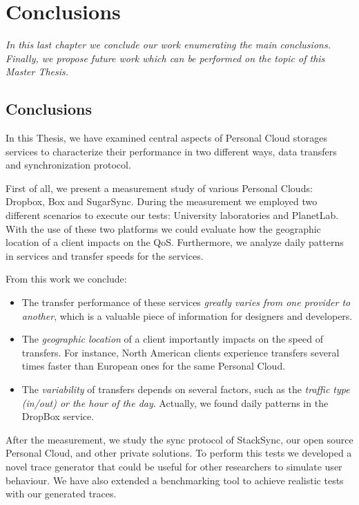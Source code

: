 \chapter{Conclusions}

\emph{In this last chapter we conclude our work enumerating the main conclusions. Finally, we propose future work which can be performed on the topic of this Master Thesis.}

\section{Conclusions}
In this Thesis, we have examined central aspects of Personal Cloud storages 
services to characterize their performance in two different ways, data transfers
and synchronization protocol.

First of all, we present a measurement study of various Personal Clouds: Dropbox, Box and SugarSync.
During the measurement we employed two different scenarios to execute our tests:
University laboratories and PlanetLab. With the use of these two platforms we could
evaluate how the geographic location of a client impacts on the QoS. Furthermore, we analyze
daily patterns in services and transfer speeds for the services.

From this work we conclude:
\begin{itemize}
	\item The transfer performance of these services 
	\textit{greatly varies from one provider to another}, which is a valuable 
	piece of information for designers and developers.
	
	\item The \textit{geographic location} of a client importantly impacts on
	the speed of transfers. For instance, North American clients experience 
	transfers several times faster than European ones for the same Personal Cloud. 
	
	\item The \textit{variability} of transfers depends on several
	factors, such as the \textit{traffic type (in/out) or the hour of the day}.
	Actually, we found daily patterns in the DropBox service.
\end{itemize}

After the measurement, we study the sync protocol of StackSync, our open source Personal Cloud,
and other private solutions. To perform this tests we developed a novel trace generator
that could be useful for other researchers to simulate user behaviour. We have also extended
a benchmarking tool to achieve realistic tests with our generated traces.

